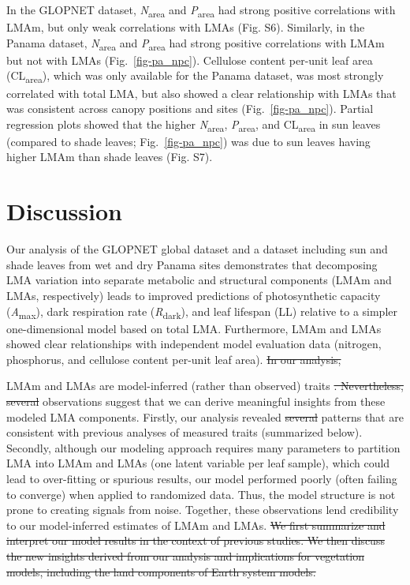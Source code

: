 \documentclass[
  12pt,
  letterpaper,
  DIV=11,
  numbers=noendperiod]{scrartcl}
\providecommand{\DIFadd}[1]{{\protect\color{blue}\uwave{#1}}} %
\providecommand{\DIFdel}[1]{{\protect\color{red}\sout{#1}}}                      %
\providecommand{\DIFaddbegin}{} %
\providecommand{\DIFaddend}{} %
\providecommand{\DIFdelbegin}{} %
\providecommand{\DIFdelend}{} %
\newcommand{\DIFscaledelfig}{0.5}
\newlength{\DIFdelgraphicswidth} %
\newlength{\DIFdelgraphicsheight} %
\newcommand{\DIFaddincludegraphics}[2][]{{\color{blue}\fbox{\DIFOincludegraphics[#1]{#2}}}} %
\newcommand{\DIFdelincludegraphics}[2][]{%
\sbox{\DIFdelgraphicsbox}{\DIFOincludegraphics[#1]{#2}}%
\settoboxwidth{\DIFdelgraphicswidth}{\DIFdelgraphicsbox} %
\settoboxtotalheight{\DIFdelgraphicsheight}{\DIFdelgraphicsbox} %
\scalebox{\DIFscaledelfig}{%
\parbox[b]{\DIFdelgraphicswidth}{\usebox{\DIFdelgraphicsbox}\\[-\baselineskip] \rule{\DIFdelgraphicswidth}{0em}}\llap{\resizebox{\DIFdelgraphicswidth}{\DIFdelgraphicsheight}{%
\setlength{\unitlength}{\DIFdelgraphicswidth}%
\begin{picture}(1,1)%
\thicklines\linethickness{2pt} %
{\color[rgb]{1,0,0}\put(0,0){\framebox(1,1){}}}%
{\color[rgb]{1,0,0}\put(0,0){\line( 1,1){1}}}%
{\color[rgb]{1,0,0}\put(0,1){\line(1,-1){1}}}%
\end{picture}%
}\hspace*{3pt}}} %
} %
\DeclareRobustCommand{\DIFaddbegin}{\DIFOaddbegin \let\includegraphics\DIFaddincludegraphics} %
\DeclareRobustCommand{\DIFaddend}{\DIFOaddend \let\includegraphics\DIFOincludegraphics} %
\DeclareRobustCommand{\DIFdelbegin}{\DIFOdelbegin \let\includegraphics\DIFdelincludegraphics} %
\DeclareRobustCommand{\DIFdelend}{\DIFOaddend \let\includegraphics\DIFOincludegraphics} %
\begin{document}
In the GLOPNET dataset, \emph{N}\textsubscript{area} and
\emph{P}\textsubscript{area} had strong positive correlations with LMAm,
but only weak correlations with LMAs (Fig. S6). Similarly, in the Panama
dataset, \emph{N}\textsubscript{area} and \emph{P}\textsubscript{area}
had strong positive correlations with LMAm but not with LMAs
(Fig.~\ref{fig-pa_npc}). Cellulose content per-unit leaf area
(CL\textsubscript{area}), which was only available for the Panama
dataset, was most strongly correlated with total LMA, but also showed a
clear relationship with LMAs that was consistent across canopy positions
and sites (Fig.~\ref{fig-pa_npc}). Partial regression plots showed that
the higher \emph{N}\textsubscript{area}, \emph{P}\textsubscript{area},
and CL\textsubscript{area} in sun leaves (compared to shade leaves;
Fig.~\ref{fig-pa_npc}) was \DIFaddbegin \DIFadd{primarily }\DIFaddend due to sun leaves having higher
LMAm than shade leaves (Fig. S7).

\section{Discussion}\label{discussion}

Our analysis of the GLOPNET global dataset and a dataset including sun
and shade leaves from wet and dry Panama sites demonstrates that
decomposing LMA variation into separate metabolic and structural
components (LMAm and LMAs, respectively) leads to improved predictions
of photosynthetic capacity (\emph{A}\textsubscript{max}), dark
respiration rate (\emph{R}\textsubscript{dark}), and leaf lifespan (LL)
relative to a simpler one-dimensional model based on total LMA.
Furthermore, LMAm and LMAs showed clear relationships with independent
model evaluation data (nitrogen, phosphorus, and cellulose content
per-unit leaf area).
\DIFdelbegin \DIFdel{In our analysis, }\DIFdelend \DIFaddbegin 

\DIFadd{Although }\DIFaddend LMAm and LMAs are model-inferred (rather than observed) traits
\DIFdelbegin \DIFdel{. Nevertheless, several }\DIFdelend \DIFaddbegin \DIFadd{in our study, two }\DIFaddend observations suggest that we can derive meaningful
insights from these modeled LMA components. Firstly, our analysis
revealed \DIFdelbegin \DIFdel{several }\DIFdelend patterns that are consistent with previous analyses of measured
traits (summarized below). Secondly, although our modeling approach
requires many parameters to partition LMA into LMAm and LMAs (one latent
variable per leaf sample), which could lead to over-fitting or spurious
results, our model performed poorly (often failing to converge) when
applied to randomized data. Thus, the model structure is not prone to
creating signals from noise. Together, these observations lend
credibility to our model-inferred estimates of LMAm and LMAs.
\DIFdelbegin \DIFdel{We first summarize and
interpret our model results in the context of previous studies. We then
discuss the new insights derived from our analysis and implications for
vegetation models, including the land components of Earth system models.
}\DIFdelend 
\end{document}
